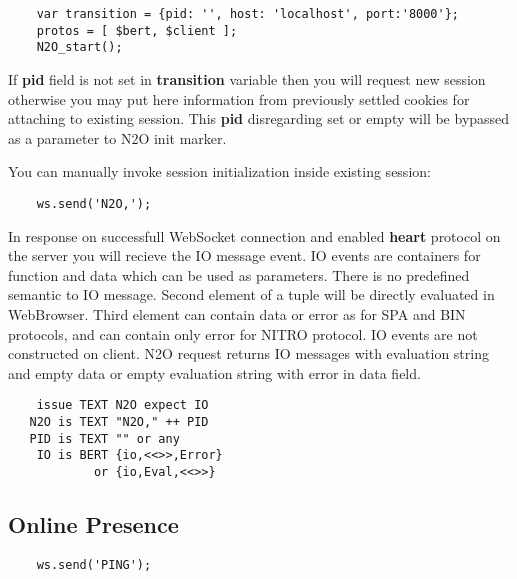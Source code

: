 \vspace{1\baselineskip}
\begin{lstlisting}
    var transition = {pid: '', host: 'localhost', port:'8000'};
    protos = [ $bert, $client ];
    N2O_start();
\end{lstlisting}
\vspace{1\baselineskip}

If {\bf pid} field is not set in {\bf transition} variable then you
will request new session otherwise you may put here information from
previously settled cookies for attaching to existing session. This {\bf pid}
disregarding set or empty will be bypassed as a parameter to N2O init marker.

You can manually invoke session initialization inside existing session:

\vspace{1\baselineskip}
\begin{lstlisting}
    ws.send('N2O,');
\end{lstlisting}

\newpage
In response on successfull WebSocket connection and enabled {\bf heart}
protocol on the server you will recieve the IO message event.
IO events are containers for function and data which can be used as parameters.
There is no predefined semantic to IO message. Second element of a tuple
will be directly evaluated in WebBrowser. Third element can contain data or error
as for SPA and BIN protocols, and can contain only error for NITRO protocol.
IO events are not constructed on client. N2O request returns IO messages with
evaluation string and empty data or empty evaluation string
with error in data field.

\vspace{1\baselineskip}
\begin{lstlisting}
    issue TEXT N2O expect IO
   N2O is TEXT "N2O," ++ PID
   PID is TEXT "" or any
    IO is BERT {io,<<>>,Error}
            or {io,Eval,<<>>}
\end{lstlisting}
\vspace{1\baselineskip}

\subsection*{Online Presence}

\vspace{1\baselineskip}
\begin{lstlisting}
    ws.send('PING');
\end{lstlisting}
\vspace{1\baselineskip}

